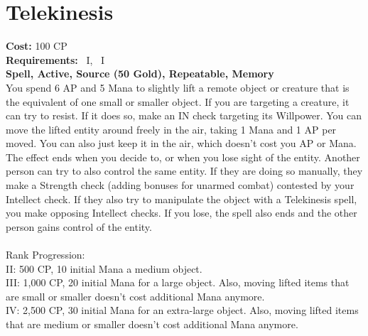 \section{Telekinesis}\label{spell:telekinesis}
\textbf{Cost:} 100 CP\\
\textbf{Requirements:}~ I,~ I\\
\textbf{Spell, Active, Source (50 Gold), Repeatable, Memory}\\
You spend 6 AP and 5 Mana to slightly lift a remote object or creature that is the equivalent of one small or smaller object.
If you are targeting a creature, it can try to resist.
If it does so, make an IN check targeting its Willpower.
You can move the lifted entity around freely in the air, taking 1 Mana and 1 AP per  moved.
You can also just keep it in the air, which doesn't cost you AP or Mana.\\
The effect ends when you decide to, or when you lose sight of the entity.
Another person can try to also control the same entity.
If they are doing so manually, they make a Strength check (adding bonuses for unarmed combat) contested by your Intellect check.
If they also try to manipulate the object with a Telekinesis spell, you make opposing Intellect checks.
If you lose, the spell also ends and the other person gains control of the entity.\\
\\
Rank Progression:\\
II: 500 CP, 10 initial Mana a medium object.\\

III: 1,000 CP, 20 initial Mana for a large object.
Also, moving lifted items that are small or smaller doesn't cost additional Mana anymore.\\

IV: 2,500 CP, 30 initial Mana for an extra-large object.
Also, moving lifted items that are medium or smaller doesn't cost additional Mana anymore.